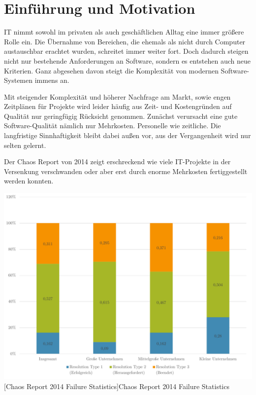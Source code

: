 \documentclass[12pt,a4paper,bibliography=totocnumbered,listof=totocnumbered]{scrartcl}
\begin{document}
\onehalfspacing
\renewcommand{\thesection}{\arabic{section}}
\renewcommand{\theHsection}{\arabic{section}}
\setcounter{section}{0}
\setcounter{page}{1}

\section{Einführung und Motivation}

IT nimmt sowohl im privaten als auch geschäftlichen Alltag eine immer größere Rolle ein. Die Übernahme von Bereichen, die ehemals als nicht durch Computer austauschbar erachtet wurden, schreitet immer weiter fort. Doch dadurch steigen nicht nur bestehende Anforderungen an Software, sondern es entstehen auch neue Kriterien. Ganz abgesehen davon steigt die Komplexität von modernen Software-Systemen immens an.

Mit steigender Komplexität und höherer Nachfrage am Markt, sowie engen Zeitplänen für Projekte wird leider häufig aus Zeit- und Kostengründen auf Qualität nur geringfügig Rücksicht genommen. Zunächst verursacht eine gute Software-Qualität nämlich nur Mehrkosten. Personelle wie zeitliche. Die langfristige Sinnhaftigkeit bleibt dabei außen vor, aus der Vergangenheit wird nur selten gelernt.

Der Chaos Report von 2014 zeigt erschreckend wie viele IT-Projekte in der Versenkung verschwanden oder aber erst durch enorme Mehrkosten fertiggestellt werden konnten.

\vspace{1em}
\begin{minipage}{\linewidth}
	\centering
	\includegraphics[width=0.9\linewidth]{images/dg_failed-projects.pdf}
	[Chaos Report 2014 Failure Statistics]{Chaos Report 2014 Failure Statistics \footnotemark}
	\label{fig:dg_failed-projects}
\end{minipage}
\end{document}
